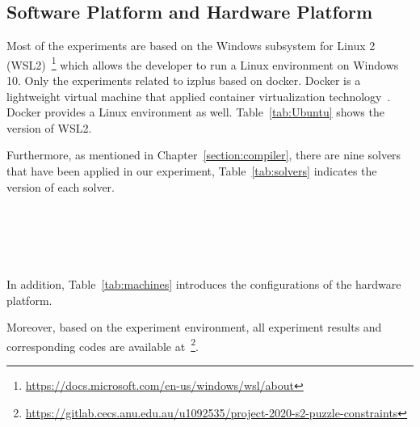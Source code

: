 \subsection{Software Platform and Hardware Platform}
\label{sec:softplat}
Most of the experiments are based on the Windows subsystem for Linux 2 (WSL2)~\footnote{\url{https://docs.microsoft.com/en-us/windows/wsl/about}} which allows the developer to run a Linux environment on Windows 10. Only the experiments related to izplus based on docker. Docker is a lightweight virtual machine that applied container virtualization technology~\cite{r25}. Docker provides a Linux environment as well. Table~\ref{tab:Ubuntu} shows the version of WSL2.
\begin{table}[htbp]
  \centering

  \caption{The version of Windows subsystem for Linux 2}
  
  \label{tab:Ubuntu}
  
\end{table}
Furthermore, as mentioned in Chapter~\ref{section:compiler}, there are nine solvers that have been applied in our experiment, Table~\ref{tab:solvers} indicates the version of each solver.
\begin{table}[htbp]
  \centering

  \caption{The deployed solvers and corresponding versions}
  
  \label{tab:solvers}
  	\begin{subtable}[b]{\textwidth}
  	\centering
  
    \end{subtable}\\
    	\begin{subtable}[b]{\textwidth}
  	\centering
  
  \end{subtable}\\
  \begin{subtable}[b]{\textwidth}
  \centering
  
  \end{subtable}
\end{table}
\\In addition, Table~\ref{tab:machines} introduces the configurations of the hardware platform.
\begin{table}[H]
  \centering

  \caption{Processor used in our evaluation}
  
  \label{tab:machines}
  
\end{table}
Moreover, based on the experiment environment, all experiment results and corresponding codes are available at~\footnote{\url{https://gitlab.cecs.anu.edu.au/u1092535/project-2020-s2-puzzle-constraints}}.
